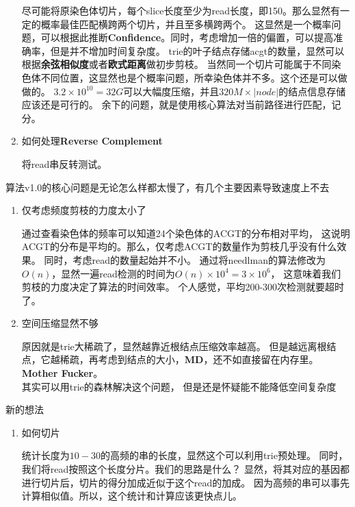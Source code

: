 \documentclass[hyperref,UTF8]{ctexart}
\theoremstyle{definition}
\theoremstyle{remark}
\numberwithin{equation}{subsection}
\newcommand{\Emph}{\textbf}
\begin{document}
\begin{enumerate}
		尽可能将原染色体切片，每个slice长度至少为read长度，即150。那么显然有一定的概率最佳匹配横跨两个切片，并且至多横跨两个。
		这显然是一个概率问题，可以根据此推断\Emph{Confidence}。同时，考虑增加一倍的偏置，可以提高准确率，但是并不增加时间复杂度。
		trie的叶子结点存储acgt的数量，显然可以根据\Emph{余弦相似度}或者\Emph{欧式距离}做初步剪枝。
		当然同一个切片可能属于不同染色体不同位置，这显然也是个概率问题，所幸染色体并不多。这个还是可以做做的。
		$3.2 \times 10^10 = 32G$可以大幅度压缩，并且$320M \times |node|$的结点信息存储应该还是可行的。
		余下的问题，就是使用核心算法对当前路径进行匹配，记分。

		\item 如何处理\Emph{Reverse Complement}
		
		将read串反转测试。
	
	\end{enumerate}
	
	算法v1.0的核心问题是无论怎么样都太慢了，有几个主要因素导致速度上不去
	\begin{enumerate}
	
		\item 仅考虑频度剪枝的力度太小了
		
		通过查看染色体的频率可以知道24个染色体的ACGT的分布相对平均，
		这说明ACGT的分布是平均的。那么，仅考虑ACGT的数量作为剪枝几乎没有什么效果。
		同时，考虑read的数量起始并不小。
		通过将needlman的算法修改为$O(n)$，显然一遍read检测的时间为$O(n) \times 10^4 = 3\times10^6$，
		这意味着我们剪枝的力度决定了算法的时间效率。
		个人感觉，平均200-300次检测就要超时了。
		
		\item 空间压缩显然不够
		
		原因就是trie大稀疏了，显然越靠近根结点压缩效率越高。
		但是越远离根结点，它越稀疏，再考虑到结点的大小，\Emph{MD}，还不如直接留在内存里。\\
		\Emph{Mother Fucker}。\\
		其实可以用trie的森林解决这个问题，
		但是还是怀疑能不能降低空间复杂度
		
	\end{enumerate}
	
	新的想法
	\begin{enumerate}

        \item 如何切片

    	统计长度为$10-30$的高频的串的长度，显然这个可以利用trie预处理。
    	同时，我们将read按照这个长度分片。我们的思路是什么？
    	显然，将其对应的基因都进行切片后，切片的得分加成近似于这个read的加成。
    	因为高频的串可以事先计算相似值。所以，这个统计和计算应该更快点儿。



	\end{enumerate}
	
	
\end{document}

